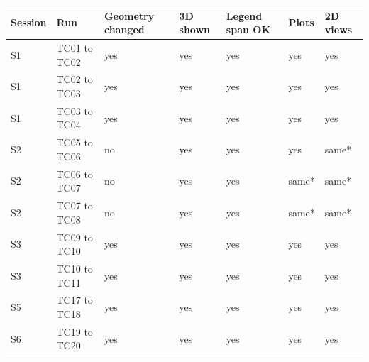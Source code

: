 \begin{tabular}{@{}lllllll@{}}
\toprule
\textbf{Session} & \textbf{Run} & \textbf{Geometry changed} & \textbf{3D shown} & \textbf{Legend span OK} & \textbf{Plots} & \textbf{2D views} \\
\midrule
S1 & TC01 to TC02 & yes & yes & yes & yes & yes \\
S1 & TC02 to TC03 & yes & yes & yes & yes & yes \\
S1 & TC03 to TC04 & yes & yes & yes & yes & yes \\
S2 & TC05 to TC06 & no & yes & yes & yes & same* \\
S2 & TC06 to TC07 & no & yes & yes & same* & same* \\
S2 & TC07 to TC08 & no & yes & yes & same* & same* \\
S3 & TC09 to TC10 & yes & yes & yes & yes & yes \\
S3 & TC10 to TC11 & yes & yes & yes & yes & yes \\
S5 & TC17 to TC18 & yes & yes & yes & yes & yes \\
S6 & TC19 to TC20 & yes & yes & yes & yes & yes \\
\bottomrule
\end{tabular}
